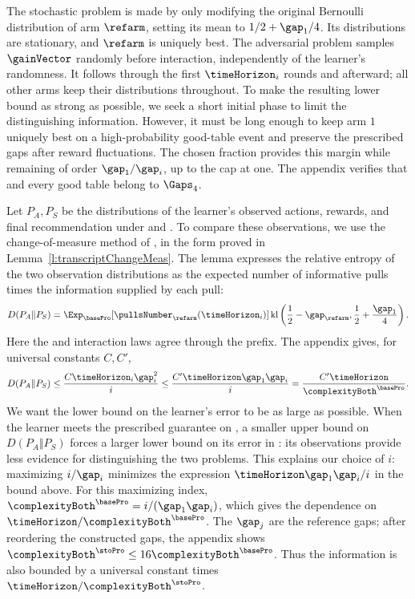 The stochastic problem \stoPro{} is made by only modifying the original
Bernoulli distribution of arm $\refarm$, setting its mean to
$1/2+\gap_1/4$. Its distributions are stationary, and $\refarm$ is
uniquely best. The adversarial problem \advPro{} samples $\gainVector$ randomly
before interaction, independently of the learner's randomness.
It follows \basePro{} through the first $\timeHorizon_i$ rounds and
\stoPro{} afterward; all other arms keep their distributions throughout.
To make the resulting lower bound as strong as possible, we seek a
short initial phase to limit the distinguishing information.
However, it must be long enough to keep arm $1$ uniquely best on a
high-probability good-table event and preserve the prescribed gaps
after reward fluctuations. The chosen fraction provides this margin
while remaining of order $\gap_1/\gap_i$, up to the cap at one.
The appendix verifies that \stoPro{} and every good \advPro{} table
belong to $\Gaps_4$.

Let $P_A,P_S$ be the distributions of the learner's observed actions,
rewards, and final recommendation under \advPro{} and \stoPro{}.
To compare these observations, we use the change-of-measure
method of \citet*{Kaufmann16CBI}, in the form proved in
Lemma~\ref{l:transcriptChangeMeas}.
The lemma expresses the relative entropy of the two observation
distributions as the expected number of informative pulls times
the information supplied by each pull:
\[
D(P_A\Vert P_S)
=\Exp_{\basePro}[\pullsNumber_{\refarm}(\timeHorizon_i)]
\operatorname{kl}\left(\frac12-\gap_{\refarm},\frac12+\frac{\gap_1}{4}\right).
\]
Here the \advPro{} and \basePro{} interaction laws agree through the
prefix. The appendix gives, for universal constants $C,C'$,
\[
D(P_A\Vert P_S)
\leq\frac{C\timeHorizon_i\gap_i^2}{i}
\leq\frac{C'\timeHorizon\gap_1\gap_i}{i}
=\frac{C'\timeHorizon}{\complexityBoth^{\basePro}}.
\]
We want the lower bound on the learner's error to be as large
as possible. When the learner meets the prescribed guarantee
on \stoPro{}, a smaller upper bound on $D(P_A\Vert P_S)$ forces
a larger lower bound on its error in \advPro{}: its observations
provide less evidence for distinguishing the two problems.
This explains our choice of $i$: maximizing $i/\gap_i$ minimizes
the expression $\timeHorizon\gap_1\gap_i/i$ in the bound above.
For this maximizing index,
$\complexityBoth^{\basePro}=i/(\gap_1\gap_i)$, which gives the
dependence on $\timeHorizon/\complexityBoth^{\basePro}$.
The $\gap_j$ are the reference gaps; after reordering the constructed
\stoPro{} gaps, the appendix shows
$\complexityBoth^{\stoPro}\leq16\complexityBoth^{\basePro}$.
Thus the information is also bounded by a universal constant times
$\timeHorizon/\complexityBoth^{\stoPro}$.

